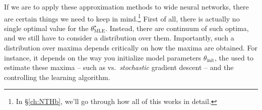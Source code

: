 If we are to apply these approximation methods to wide neural networks, there are certain things we need to keep in mind.\footnote{
In \S\ref{ch:NTHb}, we'll go through how all of this works in detail.
}
First of all,
there is actually no single optimal value for the  $\theta^\star_{\text{MLE}}$. Instead, there are continuum of such optima, and we still have to consider a distribution over them. Importantly, such a distribution over maxima depends critically on how the maxima are obtained. For instance, it depends on the way you initialize model parameters $\theta_{\text{init}}$, the  used to estimate these maxima -- such as  vs.~\emph{stochastic} gradient descent -- and the  controlling the learning algorithm. 
